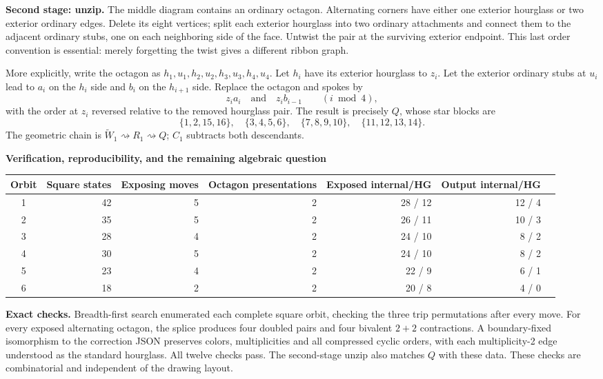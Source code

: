 \documentclass[11pt]{article}
\newcommand{\heading}[1]{{\Large\bfseries\color{ink}#1}\par}
\begin{document}
\textbf{Second stage: unzip.} The middle diagram contains an ordinary
octagon. Alternating corners have either one exterior hourglass or two
exterior ordinary edges. Delete its eight vertices; split each exterior
hourglass into two ordinary attachments and connect them to the adjacent
ordinary stubs, one on each neighboring side of the face. Untwist the pair at
the surviving exterior endpoint. This last order convention is essential:
merely forgetting the twist gives a different ribbon graph.

More explicitly, write the octagon as $h_1,u_1,h_2,u_2,h_3,u_3,h_4,u_4$.
Let $h_i$ have its exterior hourglass to $z_i$. Let the exterior ordinary
stubs at $u_i$ lead to $a_i$ on the $h_i$ side and $b_i$ on the $h_{i+1}$
side. Replace the octagon and spokes by
\[
z_i a_i\quad\text{and}\quad z_i b_{i-1}\qquad(i\bmod 4),
\]
with the order at $z_i$ reversed relative to the removed hourglass pair.
The result is precisely $Q$, whose star blocks are
\[
\{1,2,15,16\},\quad\{3,4,5,6\},\quad
\{7,8,9,10\},\quad\{11,12,13,14\}.
\]
The geometric chain is $\widetilde W_1\rightsquigarrow R_1\rightsquigarrow Q$; $C_1$ subtracts both descendants.

\newpage
\heading{Verification, reproducibility, and the remaining algebraic question}
\begin{center}\small
\begin{tabular}{crrrrrr}
\toprule
Orbit & Square states & Exposing moves & Octagon presentations & Exposed internal/HG & Output internal/HG\\
\midrule
1 & 42 & 5 & 2 & 28 / 12 & 12 / 4\\
2 & 35 & 5 & 2 & 26 / 11 & 10 / 3\\
3 & 28 & 4 & 2 & 24 / 10 & 8 / 2\\
4 & 30 & 5 & 2 & 24 / 10 & 8 / 2\\
5 & 23 & 4 & 2 & 22 / 9 & 6 / 1\\
6 & 18 & 2 & 2 & 20 / 8 & 4 / 0\\
\bottomrule
\end{tabular}\end{center}
\textbf{Exact checks.} Breadth-first search enumerated each complete square
orbit, checking the three trip permutations after every move. For every
exposed alternating octagon, the splice produces four doubled pairs and four
bivalent $2+2$ contractions. A boundary-fixed isomorphism to the correction
JSON preserves colors, multiplicities and all compressed cyclic orders, with
each multiplicity-2 edge understood as the standard hourglass. All twelve
checks pass. The second-stage unzip also matches $Q$ with these data. These
checks are combinatorial and independent of the drawing layout.
\end{document}
